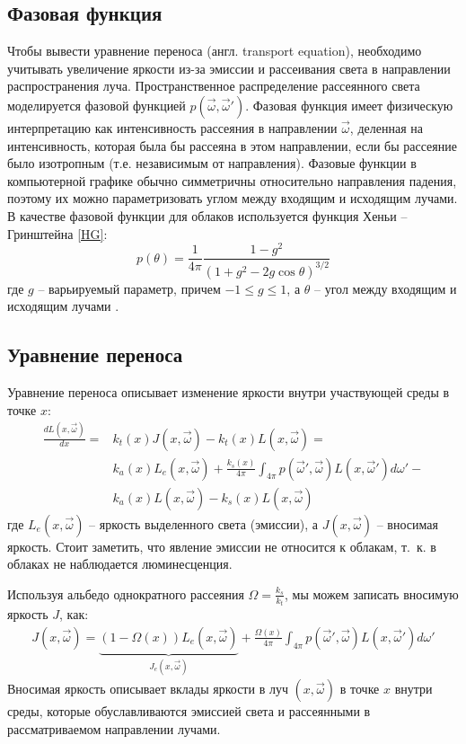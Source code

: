 \subsection{Фазовая функция}
Чтобы вывести уравнение переноса (англ. transport equation), необходимо учитывать увеличение яркости из-за эмиссии и рассеивания света в направлении распространения луча. Пространственное распределение рассеянного света моделируется фазовой функцией $ p(\vec{\omega}, \vec{\omega}') $. Фазовая функция имеет физическую интерпретацию как интенсивность рассеяния в направлении $\vec{\omega}$, деленная на интенсивность, которая была бы рассеяна в этом направлении, если бы рассеяние было изотропным (т.е. независимым от направления). Фазовые функции в компьютерной графике обычно симметричны относительно направления падения, поэтому их можно параметризовать углом между входящим и исходящим лучами. В качестве фазовой функции для облаков используется функция Хеньи -- Гринштейна \eqref{HG}:
\begin{equation}
	\label{HG}
	p(\theta) = \frac{1}{4\pi} \frac{1 - g^2}{(1 + g^2 - 2g\cos \theta)^{3/2}}
\end{equation}
где $ g $ -- варьируемый параметр, причем $ -1 \leq g \leq 1 $, а $\theta$ -- угол между входящим и исходящим лучами \cite{clouds}.

\subsection{Уравнение переноса}
Уравнение переноса описывает изменение яркости внутри участвующей среды в точке $ x $:
\begin{equation}
	\label{rte}
	\begin{aligned}
		\frac{dL(x, \vec{\omega})}{dx} = & k_t(x) J(x, \vec{\omega}) - k_t(x) L(x, \vec{\omega})  = \\
		 & k_a(x) L_e(x, \vec{\omega}) + \frac{k_s(x)}{4\pi} \int_{4\pi} p(\vec{\omega}', \vec{\omega}) L(x, \vec{\omega}') d\omega' - \\
		& k_a(x) L(x, \vec{\omega}) - k_s(x) L(x, \vec{\omega})	
	\end{aligned}
\end{equation}
где $ L_e(x, \vec{\omega}) $ -- яркость выделенного света (эмиссии), а $ J(x, \vec{\omega}) $ -- вносимая яркость. Стоит заметить, что явление эмиссии не относится к облакам, т.~к. в облаках не наблюдается люминесценция.    
 
Используя альбедо однократного рассеяния $ \Omega = \frac{k_s}{k_t} $, мы можем записать вносимую яркость $J$, как:
\begin{equation}
	\label{sourcerad}
	\begin{aligned}
		J(x, \vec{\omega}) = \underbrace{(1 - \Omega(x)) L_e(x, \vec{\omega})}_{J_e(x, \vec{\omega})} + \frac{\Omega(x)}{4\pi} \int_{4\pi} p(\vec{\omega}', \vec{\omega}) L(x, \vec{\omega}') d\omega'
	\end{aligned}
\end{equation}
Вносимая яркость описывает вклады яркости в луч $ (x, \vec{\omega}) $ в точке $ x $ внутри среды, которые обуславливаются эмиссией света и рассеянными в рассматриваемом направлении лучами. 

